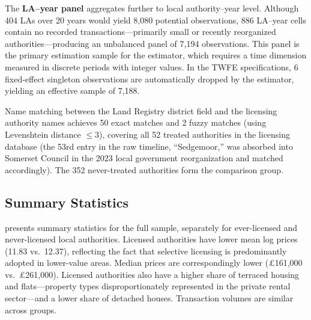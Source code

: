 \documentclass[12pt]{article}
\begin{document}
The \textbf{LA--year panel} aggregates further to local authority--year level. Although 404 LAs over 20 years would yield 8,080 potential observations, 886 LA--year cells contain no recorded transactions---primarily small or recently reorganized authorities---producing an unbalanced panel of 7,194 observations. This panel is the primary estimation sample for the \citet{callaway2021difference} estimator, which requires a time dimension measured in discrete periods with integer values. In the TWFE specifications, 6 fixed-effect singleton observations are automatically dropped by the estimator, yielding an effective sample of 7,188.

Name matching between the Land Registry district field and the licensing authority names achieves 50 exact matches and 2 fuzzy matches (using Levenshtein distance $\leq 3$), covering all 52 treated authorities in the licensing database (the 53rd entry in the raw timeline, ``Sedgemoor,'' was absorbed into Somerset Council in the 2023 local government reorganization and matched accordingly). The 352 never-treated authorities form the comparison group.

\subsection{Summary Statistics}

 presents summary statistics for the full sample, separately for ever-licensed and never-licensed local authorities. Licensed authorities have lower mean log prices (11.83 vs.\ 12.37), reflecting the fact that selective licensing is predominantly adopted in lower-value areas. Median prices are correspondingly lower (\pounds 161,000 vs.\ \pounds 261,000). Licensed authorities also have a higher share of terraced housing and flats---property types disproportionately represented in the private rental sector---and a lower share of detached houses. Transaction volumes are similar across groups.
\end{document}
